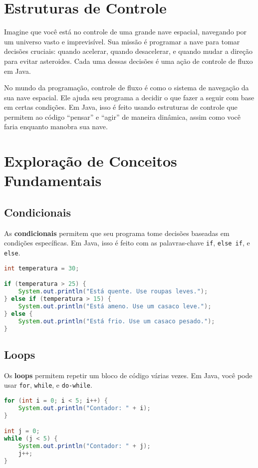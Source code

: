 \documentclass[a4paper,12pt]{book}
\begin{document}
\section{Estruturas de Controle}

Imagine que você está no controle de uma grande nave espacial, navegando por um universo vasto e imprevisível. Sua missão é programar a nave para tomar decisões cruciais: quando acelerar, quando desacelerar, e quando mudar a direção para evitar asteroides. Cada uma dessas decisões é uma ação de controle de fluxo em Java.

No mundo da programação, controle de fluxo é como o sistema de navegação da sua nave espacial. Ele ajuda seu programa a decidir o que fazer a seguir com base em certas condições. Em Java, isso é feito usando estruturas de controle que permitem ao código ``pensar'' e ``agir'' de maneira dinâmica, assim como você faria enquanto manobra sua nave.

\section{Exploração de Conceitos Fundamentais}

\subsection{Condicionais}

As \textbf{condicionais} permitem que seu programa tome decisões baseadas em condições específicas. Em Java, isso é feito com as palavras-chave \texttt{if}, \texttt{else if}, e \texttt{else}.

\begin{lstlisting}[language=Java]
int temperatura = 30;

if (temperatura > 25) {
    System.out.println("Está quente. Use roupas leves.");
} else if (temperatura > 15) {
    System.out.println("Está ameno. Use um casaco leve.");
} else {
    System.out.println("Está frio. Use um casaco pesado.");
}
\end{lstlisting}

\subsection{Loops}

Os \textbf{loops} permitem repetir um bloco de código várias vezes. Em Java, você pode usar \texttt{for}, \texttt{while}, e \texttt{do-while}.

\begin{lstlisting}[language=Java]
for (int i = 0; i < 5; i++) {
    System.out.println("Contador: " + i);
}

int j = 0;
while (j < 5) {
    System.out.println("Contador: " + j);
    j++;
}
\end{lstlisting}
\end{document}
